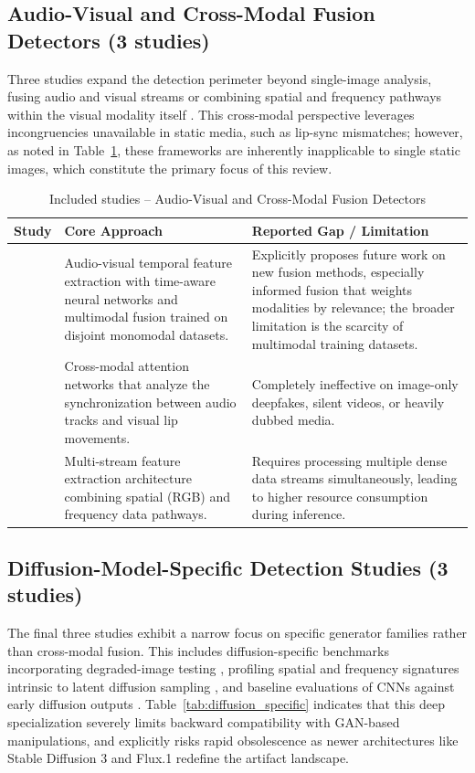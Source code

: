 \documentclass[sn-mathphys-num,Numbered,pdflatex]{sn-jnl}
\begin{document}
\subsection{Audio-Visual and Cross-Modal Fusion Detectors (3 studies)}
Three studies expand the detection perimeter beyond single-image analysis, fusing audio and visual streams \cite{ARobust11,ContextualCrossmodal68} or combining spatial and frequency pathways within the visual modality itself \cite{AMultimodal69}. This cross-modal perspective leverages incongruencies unavailable in static media, such as lip-sync mismatches; however, as noted in Table~\ref{tab:audiovisual_multimodal}, these frameworks are inherently inapplicable to single static images, which constitute the primary focus of this review.

\begin{table}[htbp]
\caption{Included studies -- Audio-Visual and Cross-Modal Fusion Detectors}
\label{tab:audiovisual_multimodal}
\centering\footnotesize
\begin{tabularx}{\columnwidth}{@{}p{} X X@{}}
\toprule
\textbf{Study} & \textbf{Core Approach} & \textbf{Reported Gap / Limitation} \\
\midrule
\cite{ARobust11} & Audio-visual temporal feature extraction with time-aware neural networks and multimodal fusion trained on disjoint monomodal datasets. & Explicitly proposes future work on new fusion methods, especially informed fusion that weights modalities by relevance; the broader limitation is the scarcity of multimodal training datasets. \\
\cite{ContextualCrossmodal68} & Cross-modal attention networks that analyze the synchronization between audio tracks and visual lip movements. & Completely ineffective on image-only deepfakes, silent videos, or heavily dubbed media. \\
\cite{AMultimodal69} & Multi-stream feature extraction architecture combining spatial (RGB) and frequency data pathways. & Requires processing multiple dense data streams simultaneously, leading to higher resource consumption during inference. \\
\bottomrule
\end{tabularx}
\end{table}
\FloatBarrier

\subsection{Diffusion-Model-Specific Detection Studies (3 studies)}
The final three studies exhibit a narrow focus on specific generator families rather than cross-modal fusion. This includes diffusion-specific benchmarks incorporating degraded-image testing \cite{RobustnessAnd7}, profiling spatial and frequency signatures intrinsic to latent diffusion sampling \cite{DiffusionDeepfake70}, and baseline evaluations of CNNs against early diffusion outputs \cite{TowardsThe71}. Table~\ref{tab:diffusion_specific} indicates that this deep specialization severely limits backward compatibility with GAN-based manipulations, and explicitly risks rapid obsolescence as newer architectures like Stable Diffusion 3 and Flux.1 redefine the artifact landscape.
\end{document}

